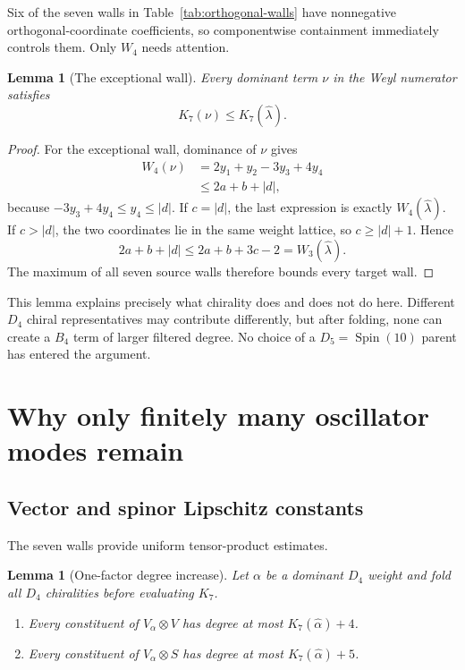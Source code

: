 \documentclass[11pt,a4paper]{article}
\newtheorem{lemma}[theorem]{Lemma}
\theoremstyle{definition}
\newcommand{\Spin}{\operatorname{Spin}}
\newcommand{\Kseven}{K_{7}}
\begin{document}
Six of the seven walls in Table~\ref{tab:orthogonal-walls} have nonnegative
orthogonal-coordinate coefficients, so componentwise containment immediately
controls them.  Only $W_4$ needs attention.

\begin{lemma}[The exceptional wall]
Every dominant term $\nu$ in the Weyl numerator satisfies
\[
   \Kseven(\nu)\leq\Kseven(\widehat\lambda).
\]
\end{lemma}

\begin{proof}
For the exceptional wall, dominance of $\nu$ gives
\[
\begin{split}
 W_4(\nu)
 &=2y_1+y_2-3y_3+4y_4\\
 &\leq2a+b+|d|,
\end{split}
\]
because $-3y_3+4y_4\leq y_4\leq|d|$.
If $c=|d|$, the last expression is exactly $W_4(\widehat\lambda)$.
If $c>|d|$, the two coordinates lie in the same weight lattice, so
$c\geq|d|+1$.  Hence
\[
   2a+b+|d|\leq2a+b+3c-2=W_3(\widehat\lambda).
\]
The maximum of all seven source walls therefore bounds every target wall.
\end{proof}

This lemma explains precisely what chirality does and does not do here.
Different $D_4$ chiral representatives may contribute differently, but after
folding, none can create a $B_4$ term of larger filtered degree.  No choice of
a $D_5=\Spin(10)$ parent has entered the argument.

\section{Why only finitely many oscillator modes remain}

\subsection{Vector and spinor Lipschitz constants}

The seven walls provide uniform tensor-product estimates.

\begin{lemma}[One-factor degree increase]
Let $\alpha$ be a dominant $D_4$ weight and fold all $D_4$ chiralities before
evaluating $\Kseven$.
\begin{enumerate}
  \item Every constituent of $V_\alpha\otimes V$ has degree at most
        $\Kseven(\widehat\alpha)+4$.
  \item Every constituent of $V_\alpha\otimes S$ has degree at most
        $\Kseven(\widehat\alpha)+5$.
\end{enumerate}
\end{lemma}
\end{document}
